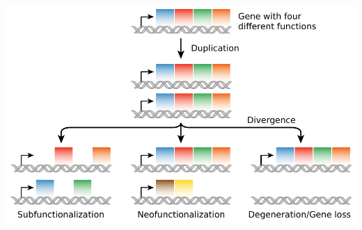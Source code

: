 \documentclass[10pt,aspectratio=169]{beamer}
\newcounter{frame}[frame]
\begin{document}
\begin{frame}
\begin{minipage}[t]{.02\linewidth}\hspace{-1cm}
	\includegraphics[width=6\linewidth]{fig/Evolution_fate_duplicate_genes_-_vector.pdf}\vspace{-3cm}
\end{minipage}

\vfill


\end{frame}
\end{document}
